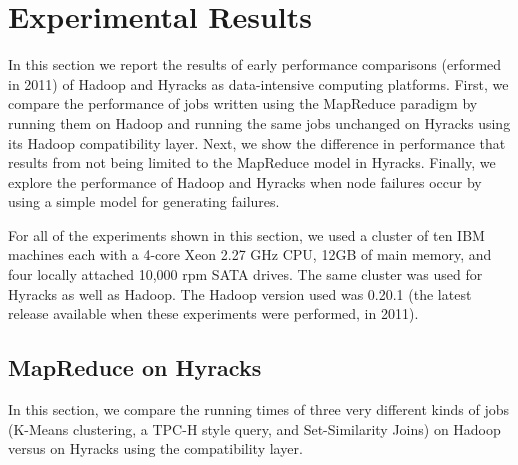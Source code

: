 \section{Experimental Results}
\label{ch:hyracks:sec:experiments}

In this section we report the results of early performance comparisons (erformed in 2011) of Hadoop and Hyracks as data-intensive computing platforms. First, we compare the performance
of jobs written using the
MapReduce paradigm by running them on Hadoop and running the same jobs unchanged on Hyracks using its Hadoop compatibility layer. Next, we show the difference in performance
that results from not being limited to the MapReduce model in Hyracks. Finally, we explore the performance of Hadoop and Hyracks when node failures occur by using a simple model
for generating failures.

For all of the experiments shown in this section, we used a cluster
of ten IBM machines each with a 4-core Xeon 2.27 GHz CPU, 12GB of main memory, and four locally attached 10,000 rpm SATA drives. The same cluster was used for Hyracks
as well as Hadoop. The Hadoop version used was 0.20.1 (the latest release available when these experiments were performed, in 2011).

\subsection{MapReduce on Hyracks}

In this section, we compare the running times of three very different kinds of jobs (K-Means clustering, a TPC-H style query, and Set-Similarity Joins) on Hadoop
versus on Hyracks using the compatibility layer.


